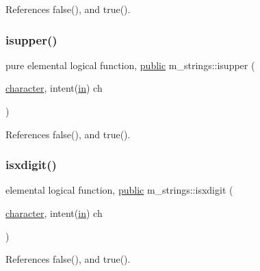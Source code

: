 References false(), and true().

\mbox{\label{namespacem__strings_ac98536a1b69026cd5373dfff489f7733}} 
\subsubsection{\texorpdfstring{isupper()}{isupper()}}
{\footnotesize\ttfamily pure elemental logical function, \hyperlink{M__stopwatch_83_8txt_a2f74811300c361e53b430611a7d1769f}{public} m\+\_\+strings\+::isupper (\begin{DoxyParamCaption}\item[{\hyperlink{option__stopwatch_83_8txt_abd4b21fbbd175834027b5224bfe97e66}{character}, intent(\hyperlink{M__journal_83_8txt_afce72651d1eed785a2132bee863b2f38}{in})}]{ch }\end{DoxyParamCaption})}



References false(), and true().

\mbox{\label{namespacem__strings_a9953d1e400bedceab6a06910c6cdf208}} 
\subsubsection{\texorpdfstring{isxdigit()}{isxdigit()}}
{\footnotesize\ttfamily elemental logical function, \hyperlink{M__stopwatch_83_8txt_a2f74811300c361e53b430611a7d1769f}{public} m\+\_\+strings\+::isxdigit (\begin{DoxyParamCaption}\item[{\hyperlink{option__stopwatch_83_8txt_abd4b21fbbd175834027b5224bfe97e66}{character}, intent(\hyperlink{M__journal_83_8txt_afce72651d1eed785a2132bee863b2f38}{in})}]{ch }\end{DoxyParamCaption})}



References false(), and true().

\mbox{\label{namespacem__strings_aa1427d5dd673ff986236ba1732e693c1}} 
